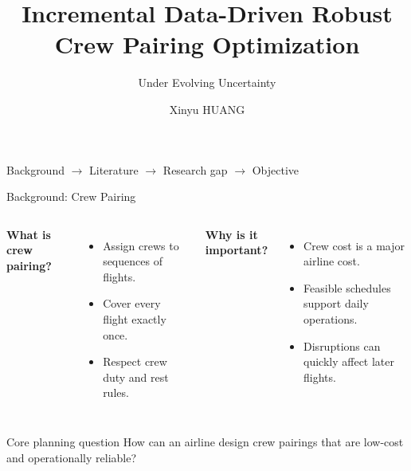 \documentclass[aspectratio=169]{beamer}
\title[Research Introduction]{Incremental Data-Driven Robust Crew Pairing Optimization}
\subtitle{Under Evolving Uncertainty}
\author{Xinyu HUANG}
\institute{The Hong Kong Polytechnic University}
\date{}
\begin{document}
\begin{frame}
  \titlepage
  \vspace{-0.35cm}
  \begin{center}
    \small Background $\rightarrow$ Literature $\rightarrow$ Research gap $\rightarrow$ Objective
  \end{center}
\end{frame}

\begin{frame}{Background: Crew Pairing}
  \begin{columns}[T,onlytextwidth]
      \textbf{What is crew pairing?}
      \begin{itemize}
        \item Assign crews to sequences of flights.
        \item Cover every flight exactly once.
        \item Respect crew duty and rest rules.
      \end{itemize}

      \textbf{Why is it important?}
      \begin{itemize}
        \item Crew cost is a major airline cost.
        \item Feasible schedules support daily operations.
        \item Disruptions can quickly affect later flights.
      \end{itemize}
  \end{columns}

  \vspace{0.35cm}
  \begin{block}{Core planning question}
    How can an airline design crew pairings that are low-cost and operationally reliable?
  \end{block}
\end{frame}
\end{document}
